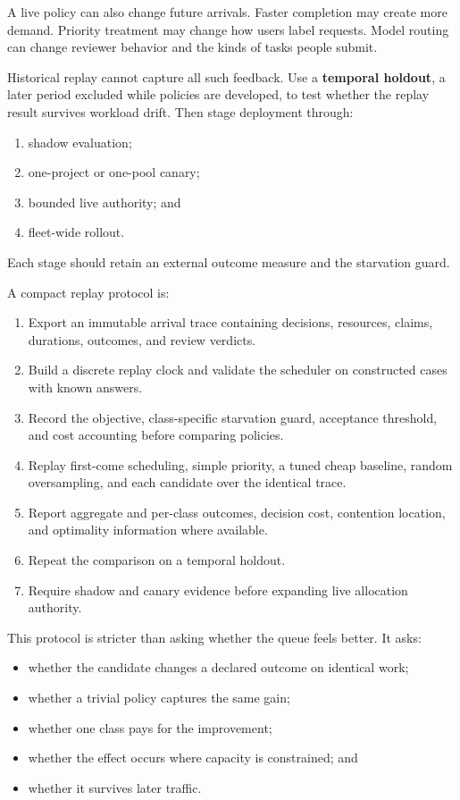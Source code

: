 A live policy can also change future arrivals. Faster completion may create more demand. Priority treatment may change how users label requests. Model routing can change reviewer behavior and the kinds of tasks people submit.

Historical replay cannot capture all such feedback. Use a \textbf{temporal holdout}, a later period excluded while policies are developed, to test whether the replay result survives workload drift. Then stage deployment through:

\begin{enumerate}
\def\labelenumi{\arabic{enumi}.}
\tightlist
\item
  shadow evaluation;
\item
  one-project or one-pool canary;
\item
  bounded live authority; and
\item
  fleet-wide rollout.
\end{enumerate}

Each stage should retain an external outcome measure and the starvation guard.

A compact replay protocol is:

\begin{enumerate}
\def\labelenumi{\arabic{enumi}.}
\tightlist
\item
  Export an immutable arrival trace containing decisions, resources, claims, durations, outcomes, and review verdicts.
\item
  Build a discrete replay clock and validate the scheduler on constructed cases with known answers.
\item
  Record the objective, class-specific starvation guard, acceptance threshold, and cost accounting before comparing policies.
\item
  Replay first-come scheduling, simple priority, a tuned cheap baseline, random oversampling, and each candidate over the identical trace.
\item
  Report aggregate and per-class outcomes, decision cost, contention location, and optimality information where available.
\item
  Repeat the comparison on a temporal holdout.
\item
  Require shadow and canary evidence before expanding live allocation authority.
\end{enumerate}

This protocol is stricter than asking whether the queue feels better. It asks:

\begin{itemize}
\tightlist
\item
  whether the candidate changes a declared outcome on identical work;
\item
  whether a trivial policy captures the same gain;
\item
  whether one class pays for the improvement;
\item
  whether the effect occurs where capacity is constrained; and
\item
  whether it survives later traffic.
\end{itemize}

